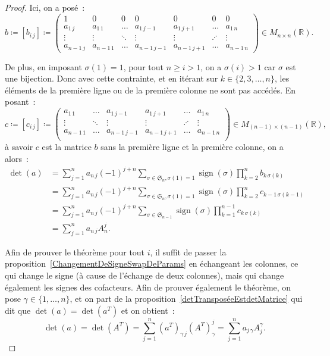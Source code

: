 \documentclass{article}
\DeclareMathOperator{\sign}{sign}
\newcommand{\R}{\mathbb R}
\newcommand{\M}[3]{M_{#1 \times #2}(#3)}
\newcommand{\Perm}{\mathfrak{S}}
\theoremstyle{definition}
\theoremstyle{remark}
\begin{document}
\begin{proof}
		Ici, on a posé~:
		\[b \coloneqq [b_{i\,j}] \coloneqq
			\begin{pmatrix}
				     1     &     0      &     0  &     0        &      0       &    0    &       0    \\
				a_{1\,j}   & a_{1\,1}   & \ldots & a_{1\,j-1}   & a_{1\,j+1}   & \ldots  & a_{1\,n}   \\
				  \vdots   &   \vdots   & \ddots &   \vdots     &   \vdots     & \iddots &   \vdots   \\
				a_{n-1\,j} & a_{n-1\,1} & \ldots & a_{n-1\,j-1} & a_{n-1\,j+1} & \ldots  & a_{n-1\,n}
			\end{pmatrix}
		\in \M nn\R.\]

		De plus, en imposant $\sigma(1) = 1$, pour tout $n \geq i > 1$, on a $\sigma(i) > 1$ car $\sigma$ est une bijection. Donc avec cette contrainte, et en
		itérant sur $k \in \{2, 3, \dotsc, n\}$, les éléments de la première ligne ou de la première colonne ne sont pas accédés. En posant~:
		\[c \coloneqq [c_{i\,j}] \coloneqq
			\begin{pmatrix}
				a_{1\,1}   & \ldots  & a_{1\,j-1}   & a_{1\,j+1}   & \ldots  & a_{1\,n}  \\
				  \vdots   & \ddots  &   \vdots     &   \vdots     & \iddots &   \vdots  \\
				a_{n-1\,1} & \ldots  & a_{n-1\,j-1} & a_{n-1\,j+1} & \ldots  & a_{n-1\,n} \\
			\end{pmatrix}
		\in \M {(n-1)}{(n-1)}\R,\]
		à savoir $c$ est la matrice $b$ sans la première ligne et la première colonne, on a alors~:
		\[\begin{aligned}
			\det(a) &= \sum_{j=1}^na_{n\,j}(-1)^{j+n}\sum_{\sigma\in\Perm_n, \sigma(1)=1}\sign(\sigma)\prod_{k=2}^nb_{k\,\sigma(k)} \\
			        &= \sum_{j=1}^na_{n\,j}(-1)^{j+n}\sum_{\sigma\in\Perm_n, \sigma(1)=1}\sign(\sigma)\prod_{k=2}^nc_{k-1\,\sigma(k-1)} \\
					&= \sum_{j=1}^na_{n\,j}(-1)^{j+n}\sum_{\sigma \in \Perm_{n-1}}\sign(\sigma)\prod_{k=1}^{n-1}c_{k\,\sigma(k)} \\
					&= \sum_{j=1}^na_{n\,j}A_n^j.
		\end{aligned}\]

		Afin de prouver le théorème pour tout $i$, il suffit de passer la proposition~\ref{ChangementDeSigneSwapDeParams} en échangeant les colonnes, ce qui change
		le signe (à cause de l'échange de deux colonnes), mais qui change également les signes des cofacteurs. Afin de prouver également le théorème,
		on pose $\gamma \in \{1, \dotsc, n\}$, et on part de la proposition~\ref{detTransposéeEstdetMatrice} qui dit que $\det(a) = \det(a^T)$ et on obtient~:
		\[\det(a) = \det(A^T) = \sum_{j=1}^n(a^T)_{\gamma\,j}(A^T)_\gamma^j = \sum_{j=1}^na_{j\,\gamma}A_j^\gamma.\] \end{proof}
\end{document}
